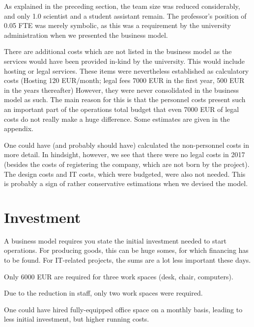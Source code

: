 \documentclass[nonflat,smallfont
]{langsci/langscibook}
\newcommand{\background}[1]{ 
  \vspace{5mm}
  \renewcommand{\tblslinecolour}{lsDarkBlue}
  \tblssy[red]{explore2}{Background}{\vspace*{-5mm}#1}
}
\newcommand{\langscisolution}[1]{
  \renewcommand{\tblslinecolour}{lsLightBlue}
  \tblssy{langsci}{LangSci solution}{\vspace*{-5mm}#1}
}
\newcommand{\evaluation}[1]{
  \renewcommand{\tblslinecolour}{lsLightOrange}
  \tblssy{receipt}{Evaluation}{\vspace*{-5mm}#1}
}
\newcommand{\othersolutions}[1]{
  \renewcommand{\tblslinecolour}{lsDarkGreenOne}
  \tblssy{more}{Other solutions}{\vspace*{-5mm}#1}
}
\renewcommand{\tblssy}[4][black!12]{%
  \renewcommand{\langscisymbol}{#2}\renewcommand{\tblsboxcolor}{#1}
  \begin{mdframed}[style=yellowexercise,frametitle={#3}]
    #4
  \end{mdframed}
}
\begin{document}
\evaluation{As explained in the preceding section, the team size was reduced considerably, and only 1.0 scientist and a student assistant remain. The professor's position of 0.05 FTE was merely symbolic, as this was a requirement by the university administration when we presented the business model. 

There are additional costs which are not listed in the business model as the services would have been provided in-kind by the university. This would include hosting or legal services. These items were nevertheless established as calculatory costs (Hosting 120 EUR/month; legal fees 7000 EUR in the first year, 500 EUR in the years thereafter) However, they were never consolidated in the business model as such. The main reason for this is that the personnel costs present such an important part of the operations total budget that even 7000 EUR of legal costs do not really make a huge difference. Some estimates are given in the appendix. 
}
\othersolutions{
One could have (and probably should have) calculated the non-personnel costs in more detail.  In hindsight, however, we see that there were no legal costs in 2017 (besides the costs of registering the company, which are not born by the project). The design costs and IT costs, which were budgeted, were also not needed.  This is probably a sign of rather conservative estimations when we devised the model. 
}
  

\section{Investment}

\background{A business model requires you state the initial investment needed to start operations. For producing goods, this can be huge somes, for which financing has to be found. For IT-related projects, the sums are a lot less important these days.}
\langscisolution{
Only 6000 EUR are required for three work spaces (desk, chair, computers). 
}
\evaluation{Due to the reduction in staff, only two work spaces were required.}
\othersolutions{
One could have hired fully-equipped office space on a monthly basis, leading to less initial investment, but higher running costs. 
}
 

% 
%  
% 
% 
%  
\end{document}
